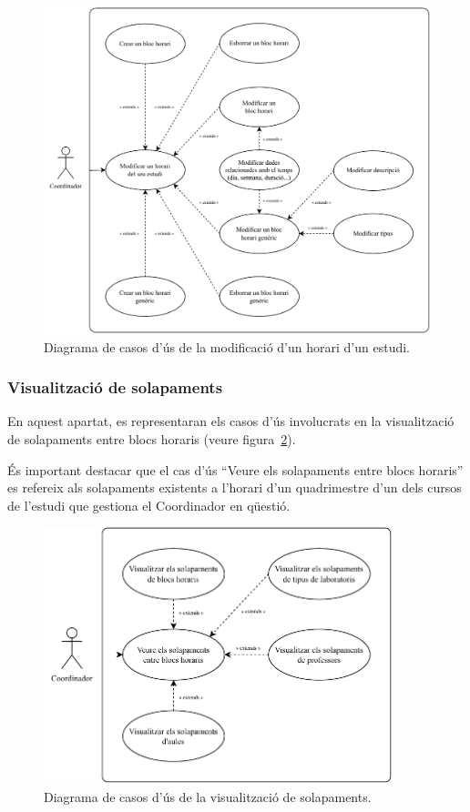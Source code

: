 \documentclass[a4paper,12pt]{ThesisStyle}
\begin{document}
\begin{figure}[H]
  \centering
  \includegraphics[width=\textwidth]{assets/use_cases/horaris/modificar/modif.pdf}
  \caption{\label{img:casos_us_horaris_modif}Diagrama de casos d'ús de la modificació d'un horari d'un estudi.}
\end{figure}

\subsubsection{Visualització de solapaments}

En aquest apartat, es representaran els casos d'ús involucrats en la visualització de solapaments entre blocs horaris (veure figura~\ref{img:casos_us_horaris_solap}).

És important destacar que el cas d'ús ``Veure els solapaments entre blocs horaris'' es refereix als solapaments existents a l'horari d'un quadrimestre d'un dels cursos de l'estudi que gestiona el Coordinador en qüestió.

\begin{figure}[H]
  \centering
  \includegraphics[width=0.9\textwidth]{assets/use_cases/horaris/modificar/solapaments.pdf}
  \caption{\label{img:casos_us_horaris_solap}Diagrama de casos d'ús de la visualització de solapaments.}
\end{figure}
\end{document}
